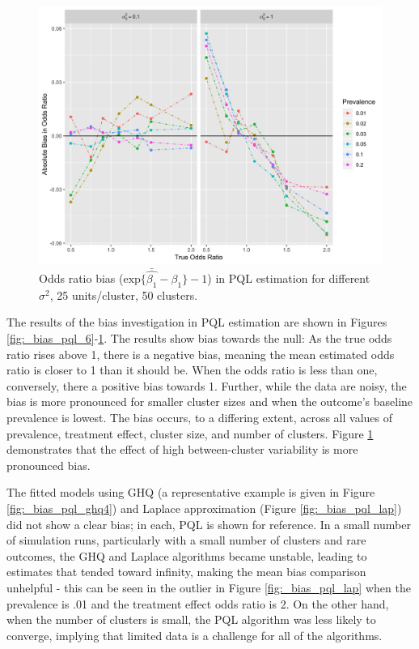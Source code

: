 \documentclass{article}
\begin{document}
\begin{flushleft}
\begin{figure}[]
\begin{center}
\includegraphics[width=\textwidth]{_bias_pql_sbs_p25_n50.png}
  \caption{Odds ratio bias ($\text{exp} \{ \bar{\hat{\beta_1}} - \beta_1 \}-1$) in PQL estimation for different $\sigma^2$, 25 units/cluster, 50 clusters.}
    \label{fig:_bias_pql_sbs_single_comparison}
\end{center}
\end{figure}

The results of the bias investigation in PQL estimation are shown in Figures \ref{fig:_bias_pql_6}-\ref{fig:_bias_pql_sbs_single_comparison}. The results show bias towards the null: As the true odds ratio rises above 1, there is a negative bias, meaning the mean estimated odds ratio is closer to 1 than it should be. When the odds ratio is less than one, conversely, there a positive bias towards 1. Further, while the data are noisy, the bias is more pronounced for smaller cluster sizes and when the outcome's baseline prevalence is lowest. The bias occurs, to a differing extent, across all values of prevalence, treatment effect, cluster size, and number of clusters. Figure \ref{fig:_bias_pql_sbs_single_comparison} demonstrates that the effect of high between-cluster variability is more pronounced bias.

The fitted models using GHQ (a representative example is given in Figure \ref{fig:_bias_pql_ghq4}) and Laplace approximation (Figure \ref{fig:_bias_pql_lap}) did not show a clear bias; in each, PQL is shown for reference. In a small number of simulation runs, particularly with a small number of clusters and rare outcomes, the GHQ and Laplace algorithms became unstable, leading to estimates that tended toward infinity, making the mean bias comparison unhelpful - this can be seen in the outlier in Figure \ref{fig:_bias_pql_lap} when the prevalence is .01 and the treatment effect odds ratio is 2. On the other hand, when the number of clusters is small, the PQL algorithm was less likely to converge, implying that limited data is a challenge for all of the algorithms.


\end{flushleft}
\end{document}

